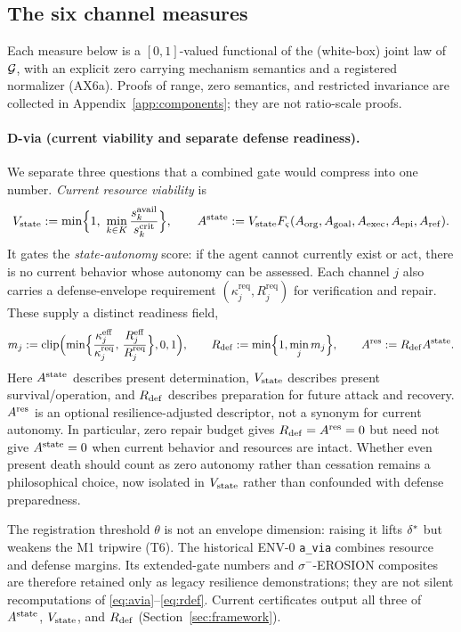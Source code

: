 \subsection{The six channel measures}\label{sec:channels}

Each measure below is a $[0,1]$-valued functional of the (white-box) joint law
of $\mathcal{G}$, with an explicit zero carrying mechanism semantics and a registered
normalizer (AX6a). Proofs of range, zero semantics, and restricted invariance
are collected in Appendix~\ref{app:components}; they are not ratio-scale proofs.

\paragraph{D-via (current viability and separate defense readiness).}
We separate three questions that a combined gate would compress into one number.
\emph{Current resource viability} is
\begin{equation}\label{eq:avia}
V_{\mathrm{state}} := \min\Bigl\{1,\ \min_{k\in K}\frac{s_k^{\mathrm{avail}}}
{s_k^{\mathrm{crit}}}\Bigr\},\qquad
A^{\mathrm{state}}:=V_{\mathrm{state}} F_\varsigma(A_{\mathrm{org}},A_{\mathrm{goal}},A_{\mathrm{exec}},A_{\mathrm{epi}},A_{\mathrm{ref}}).
\end{equation}
It gates the \emph{state-autonomy} score: if the agent cannot currently exist
or act, there is no current behavior whose autonomy can be assessed. Each
channel $j$ also carries a defense-envelope requirement
$(\kappa_j^{\mathrm{req}},R_j^{\mathrm{req}})$ for verification and repair.
These supply a distinct readiness field,
\begin{equation}\label{eq:rdef}
m_j := \mathrm{clip}\Bigl(\min\Bigl\{\frac{\kappa_j^{\mathrm{eff}}}
{\kappa_j^{\mathrm{req}}},\,\frac{R_j^{\mathrm{eff}}}{R_j^{\mathrm{req}}}
\Bigr\},0,1\Bigr),\qquad
R_{\mathrm{def}}:=\min\Bigl\{1,\min_jm_j\Bigr\},\qquad
A^{\mathrm{res}}:=R_{\mathrm{def}}A^{\mathrm{state}} .
\end{equation}
Here $A^{\mathrm{state}}$ describes present determination, $V_{\mathrm{state}}$ describes present
survival/operation, and $R_{\mathrm{def}}$ describes preparation for future attack and
recovery. $A^{\mathrm{res}}$ is an optional resilience-adjusted descriptor, not a
synonym for current autonomy. In particular, zero repair budget gives
$R_{\mathrm{def}}=A^{\mathrm{res}}=0$ but need not give $A^{\mathrm{state}}=0$ when current behavior and
resources are intact. Whether even present death should count as zero autonomy
rather than cessation remains a philosophical choice, now isolated in
$V_{\mathrm{state}}$ rather than confounded with defense preparedness.

The registration threshold $\theta$ is not an envelope dimension: raising it
lifts $\delta^{*}$ but weakens the M1 tripwire (T6). The historical ENV-0
\texttt{a\_via} combines resource and defense margins. Its extended-gate
numbers and $\sigma^{-}$-EROSION composites are therefore retained only as
legacy resilience demonstrations; they are not silent recomputations of
\eqref{eq:avia}--\eqref{eq:rdef}. Current certificates output all three of
$A^{\mathrm{state}}$, $V_{\mathrm{state}}$, and $R_{\mathrm{def}}$ (Section~\ref{sec:framework}).

